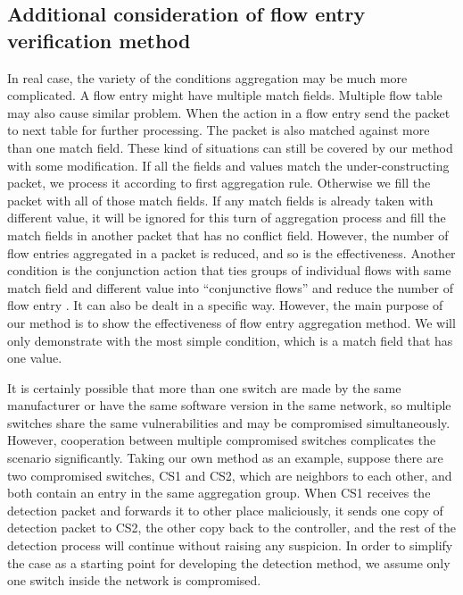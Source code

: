 \subsection{Additional consideration of flow entry verification method}
\label{Further_discussion}

In real case, the variety of the conditions aggregation may be much more complicated. A flow entry might have multiple match fields. Multiple flow table may also cause similar problem. When the action in a flow entry send the packet to next table for further processing. The packet is also matched against more than one match field. These kind of situations can still be covered by our method with some modification. 
If all the fields and values match the under-constructing packet, we process it according to first aggregation rule. Otherwise we fill the packet with all of those match fields. If any match fields is already taken with different value, it will be ignored for this turn of aggregation process and fill the match fields in another packet that has no conflict field. However, the number of flow entries aggregated in a packet is reduced, and so is the effectiveness. Another condition is the conjunction action that ties groups of individual flows with same match field and different value into ``conjunctive flows'' and reduce the number of flow entry \cite{OVS_OFCTL}. It can also be dealt in a specific way. However, the main purpose of our method is to show the effectiveness of flow entry aggregation method. We will only demonstrate with the most simple condition, which is a match field that has one value.

It is certainly possible that more than one switch are made by the same manufacturer or have the same software version in the same network, so multiple switches share the same vulnerabilities and may be compromised simultaneously. However, cooperation between multiple compromised switches complicates the scenario significantly. Taking our own method as an example, suppose there are two compromised switches, CS1 and CS2, which are neighbors to each other, and both contain an entry in the same aggregation group. When CS1 receives the detection packet and forwards it to other place maliciously, it sends one copy of detection packet to CS2, the other copy back to the controller, and the rest of the detection process will continue without raising any suspicion\sout{}. In order to simplify the case as a starting point for developing the detection method, we assume only one switch inside the network is compromised.

